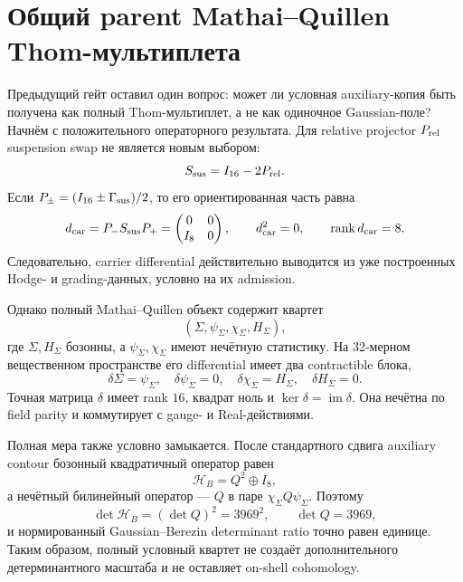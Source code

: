 \chapter{Общий parent Mathai--Quillen Thom-мультиплета}
\label{ch:v10-h15-r2-mathai-quillen-thom-multiplet-parent}

Предыдущий гейт оставил один вопрос: может ли условная auxiliary-копия быть
получена как полный Thom-мультиплет, а не как одиночное Gaussian-поле?
Начнём с положительного операторного результата. Для relative projector
$P_{\rm rel}$ suspension swap не является новым выбором:
\begin{equation}
 S_{\rm sus}=I_{16}-2P_{\rm rel}.
\end{equation}
Если $P_\pm=(I_{16}\pm\Gamma_{\rm sus})/2$, то его ориентированная часть
равна
\begin{equation}
 d_{\rm car}=P_-S_{\rm sus}P_+
 =\begin{pmatrix}0&0\\I_8&0\end{pmatrix},
 \qquad d_{\rm car}^2=0,
 \qquad \operatorname{rank} d_{\rm car}=8.
\end{equation}
Следовательно, carrier differential действительно выводится из уже
построенных Hodge- и grading-данных, условно на их admission.

Однако полный Mathai--Quillen объект содержит квартет
\begin{equation}
 (\Sigma,\psi_\Sigma,\chi_\Sigma,H_\Sigma),
\end{equation}
где $\Sigma,H_\Sigma$ бозонны, а $\psi_\Sigma,\chi_\Sigma$ имеют нечётную
статистику. На 32-мерном вещественном пространстве его differential имеет
два contractible блока,
\begin{equation}
 \delta\Sigma=\psi_\Sigma,
 \quad \delta\psi_\Sigma=0,
 \quad \delta\chi_\Sigma=H_\Sigma,
 \quad \delta H_\Sigma=0.
\end{equation}
Точная матрица $\delta$ имеет rank $16$, квадрат ноль и
$\ker\delta=\operatorname{im}\delta$. Она нечётна по field parity и
коммутирует с gauge- и Real-действиями.

Полная мера также условно замыкается. После стандартного сдвига auxiliary
contour бозонный квадратичный оператор равен
\begin{equation}
 \mathcal H_B=Q^2\oplus I_8,
\end{equation}
а нечётный билинейный оператор --- $Q$ в паре
$\chi_\Sigma Q\psi_\Sigma$. Поэтому
\begin{equation}
 \det\mathcal H_B=(\det Q)^2=3969^2,
 \qquad \det Q=3969,
\end{equation}
и нормированный Gaussian--Berezin determinant ratio точно равен единице.
Таким образом, полный условный квартет не создаёт дополнительного
детерминантного масштаба и не оставляет on-shell cohomology.

